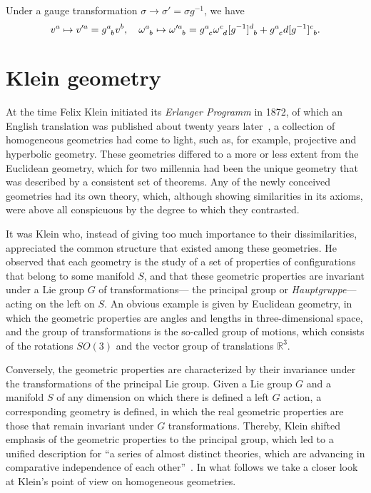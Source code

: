 \documentclass[
final,
11pt,
a4paper,
DIV=11,
headinclude=true,
footinclude=false,
bibliography=totoc,
twoside=true,  %
BCOR=5mm
]{scrbook}
\begin{document}
Under a gauge transformation $\sigma \to \sigma' = \sigma 
g^{-1}$, we have
\begin{equation*}
  v^a \mapsto v^{\prime a} = g\ind{^a_b} v^b, \quad
  \omega\ind{^a_b} \mapsto \omega\ind{^{\prime a}_b} = 
  g\ind{^a_c} \omega\ind{^c_d} [g^{-1}]\ind{^d_b} + g\ind{^a_c} 
  d[g^{-1}]\ind{^c_b}.
\end{equation*}

\section{Klein geometry}
\label{sec:Klein_geo}

At the time Felix Klein initiated its \emph{Erlanger Programm} in 
1872, of which an English translation was published about twenty 
years later~\cite{Klein:1893}, a collection of homogeneous 
geometries had come to light, such as, for example, projective 
and hyperbolic geometry. These geometries differed to a more or 
less extent from the Euclidean geometry, which for two millennia 
had been the unique geometry that was described by a consistent 
set of theorems.  Any of the newly conceived geometries had its 
own theory, which, although showing similarities in its axioms, 
were above all conspicuous by the degree to which they 
contrasted.

It was Klein who, instead of giving too much importance to their 
dissimilarities, appreciated the common structure that existed 
among these geometries. He observed that each geometry is the 
study of a set of properties of configurations that belong to 
some manifold $S$, and that these geometric properties are 
invariant under a Lie group $G$ of transformations--- the 
principal group or \emph{Hauptgruppe}--- acting on the left on 
$S$.  An obvious example is given by Euclidean geometry, in which 
the geometric properties are angles and lengths in 
three-dimensional space, and the group of transformations is the 
so-called group of motions, which consists of the rotations 
$SO(3)$ and the vector group of translations $\mathds{R}^3$.

Conversely, the geometric properties are characterized by their 
invariance under the transformations of the principal Lie group.  
Given a Lie group $G$ and a manifold $S$ of any dimension on 
which there is defined a left $G$ action, a corresponding 
geometry is defined, in which the real geometric properties are 
those that remain invariant under $G$ transformations. Thereby, 
Klein shifted emphasis of the geometric properties to the 
principal group, which led to a unified description for ``a 
series of almost distinct theories, which are advancing in 
comparative independence of each other''~\cite{Klein:1893}. In 
what follows we take a closer look at Klein's point of view on 
homogeneous geometries.
\end{document}
